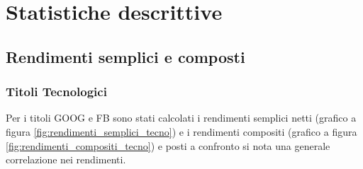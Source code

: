 \documentclass{article}
\begin{document}

\section{Statistiche descrittive}

\subsection{Rendimenti semplici e composti}

\subsubsection{Titoli Tecnologici}

Per i titoli GOOG e FB sono stati calcolati i rendimenti semplici netti (grafico a figura \ref{fig:rendimenti_semplici_tecno}) e i rendimenti compositi (grafico a figura \ref{fig:rendimenti_compositi_tecno}) e posti a confronto
si nota una generale correlazione nei rendimenti.
\end{document}
